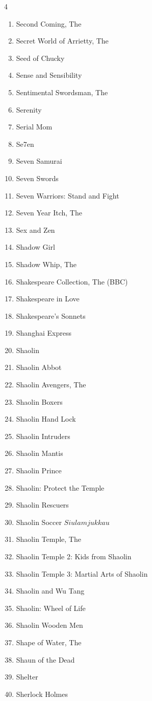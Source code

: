 \documentclass{article}
\begin{document}
\begin{multicols}{4}
\begin{enumerate}
\item Second Coming, The
\item Secret World of Arrietty, The
\item Seed of Chucky
\item Sense and Sensibility
\item Sentimental Swordsman, The
\item Serenity
\item Serial Mom
\item Se7en
\item Seven Samurai
\item Seven Swords
\item Seven Warriors: Stand and Fight
\item Seven Year Itch, The
\item Sex and Zen
\item Shadow Girl
\item Shadow Whip, The
\item Shakespeare Collection, The (BBC)
\item Shakespeare in Love
\item Shakespeare's Sonnets
\item Shanghai Express
\item Shaolin
\item Shaolin Abbot
\item Shaolin Avengers, The
\item Shaolin Boxers
\item Shaolin Hand Lock
\item Shaolin Intruders
\item Shaolin Mantis
\item Shaolin Prince
\item Shaolin: Protect the Temple
\item Shaolin Rescuers
\item Shaolin Soccer \(Siu lam juk kau\)
\item Shaolin Temple, The
\item Shaolin Temple 2: Kids from Shaolin
\item Shaolin Temple 3: Martial Arts of Shaolin
\item Shaolin and Wu Tang
\item Shaolin: Wheel of Life
\item Shaolin Wooden Men
\item Shape of Water, The
\item Shaun of the Dead
\item Shelter
\item Sherlock Holmes

\end{enumerate}
\end{multicols}
\end{document}
